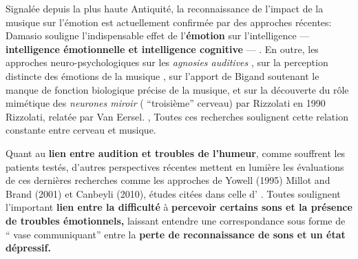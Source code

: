 Signalée depuis la plus haute Antiquité,  la reconnaissance de
l'impact de la musique sur l'émotion est actuellement confirmée par
des approches récentes: Damasio
souligne l'indispensable effet de l'\textbf{émotion}
sur l'intelligence   ---     \textbf{intelligence émotionnelle et intelligence
  cognitive} --- \autocite {damasio:lautre}.
En outre, les approches neuro-psychologiques sur les \textit{agnosies
  auditives} \autocite[ pp. 205--216]{seron.baron.ea:neuropsychologie},
sur la perception distincte des émotions de la musique
\autocite[pp. 223--224]{platel_neuropsychology_2002},
sur l'apport de Bigand  \autocite {bigand:cerveau}
soutenant le
manque de fonction biologique précise de la musique,
et sur la
découverte du rôle mimétique des\textit{ neurones miroir }( ``troisième''
cerveau) par  Rizzolati en 1990 Rizzolati,\autocite{Yowell} relatée par Van Eersel.
\autocite[118--119]{van_eersel_cerveau},
Toutes ces recherches soulignent cette relation constante entre cerveau et musique.


Quant au \textbf{ lien entre audition et troubles de l'humeur}, comme souffrent
les patients testés, d'autres perspectives
récentes mettent en lumière les évaluations de ces dernières recherches  comme les
approches de Yowell (1995) \autocite{Yowell}
  Millot and Brand (2001) et
Canbeyli (2010),\autocite{Canbeyli}
études citées dans celle d' \autocite{affectiveDisorders}. Toutes soulignent
l'important\textbf{ lien entre la difficulté}
à \textbf{percevoir certains sons et la présence de troubles émotionnels,}
laissant entendre une correspondance sous forme de `` vase communiquant''
entre la \textbf{perte de reconnaissance de
sons et un état dépressif.}

